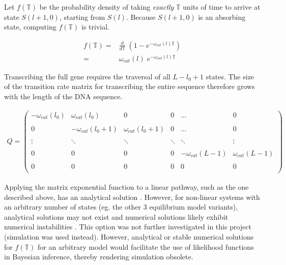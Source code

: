 \documentclass[10pt,letterpaper]{article}
\begin{document}
Let $f(\mathbb{T})$ be the probability density of taking \textit{exactly} $\mathbb{T}$ units of time to arrive at state $S(l+1,0)$, starting from $S(l)$. Because $S(l+1,0)$ is an absorbing state, computing $f(\mathbb{T})$ is trivial.


\begin{align}
    f(\mathbb{T}) =& \frac{d}{d\mathbb{T}} \; (1 - e^{-\omega_{cat}(l) \mathbb{T}}) \\
     =& \omega_{cat}(l) \; e^{- \omega_{cat}(l) \mathbb{T}}
\end{align}





Transcribing the full gene requires the traversal of all $L - l_0 + 1$ states. The size of the transition rate matrix for transcribing the entire sequence therefore grows with the length of the DNA sequence.


\begin{align}
    Q = \begin{pmatrix}
        -\omega_{cat}(l_0) & \omega_{cat}(l_0) & 0 & 0 & \dotso & 0 \\ \\
        0 & -\omega_{cat}(l_0 + 1) & \omega_{cat}(l_0 + 1) & 0 & \dotso & 0 \\ \\
        \vdots & \ddots & \ddots &  \ddots & \ddots & \vdots\\ \\
        0 & 0 & 0 & 0 & -\omega_{cat}(L - 1) & \omega_{cat}(L - 1) \\ \\
        0 & 0 & 0 & 0 & 0  & 0\\
    \end{pmatrix}
\end{align}


Applying the matrix exponential function to a linear pathway, such as the one described above, has an analytical solution \cite{jahnke2007solving}. However, for non-linear systems with an arbitrary number of states (eg. the other 3 equilibrium model variants), analytical solutions may not exist and numerical solutions likely exhibit numerical instabilities \cite{moler2003nineteen}. This option was not further investigated in this project (simulation was used instead). However, analytical or stable numerical solutions for $f(\mathbb{T})$ for an arbitrary model would facilitate the use of likelihood functions in Bayesian inference, thereby rendering simulation obsolete.
\end{document}

